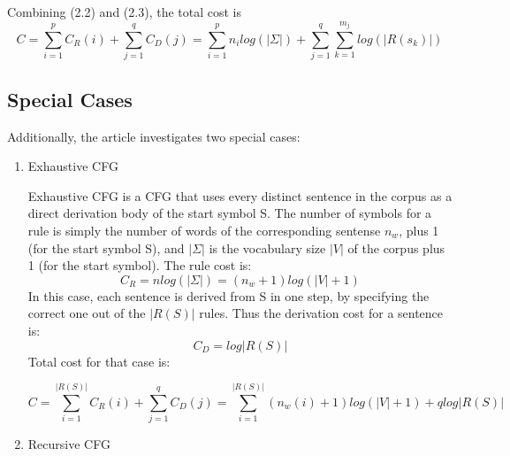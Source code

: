 \documentclass[paper=a4, fontsize=11pt]{scrartcl} %
\numberwithin{equation}{section} %
\numberwithin{figure}{section} %
\numberwithin{table}{section} %
\begin{document}
Combining (2.2) and (2.3), the total cost is
\begin{equation}\label{first}
C = \sum \limits_{i=1}^p C_R(i) + \sum\limits_{j=1}^q C_D(j) = \sum \limits_{i=1}^p n_i log(\lvert \Sigma \rvert) + \sum\limits_{j=1}^q \sum\limits_{k=1}^{m_j} log(\lvert R(s_k) \rvert)
\end{equation}

\subsection{Special Cases}
Additionally, the article investigates two special cases:
\begin{enumerate}[1.]
\item Exhaustive CFG

Exhaustive CFG is a CFG that uses every distinct sentence in the corpus as a direct derivation body of the start symbol S. The number of symbols for a rule is simply the number of words of the corresponding sentense \begin{math} n_w \end{math}, plus 1 (for the start symbol S), and \begin{math} \lvert \Sigma \rvert \end{math} is the vocabulary size \begin{math} \lvert V \rvert \end{math} of the corpus plus 1 (for the start symbol). The rule cost is:
\begin{equation}\label{first}
C_R = n log(\lvert \Sigma \rvert) = (n_w + 1)log(\lvert V \rvert + 1)
\end{equation}
In this case, each sentence is derived from S in one step, by specifying the correct one out of the \begin{math} \lvert R(S) \rvert \end{math} rules. Thus the derivation cost for a sentence is:
\begin{equation}\label{first}
C_D = log \lvert R(S) \rvert
\end{equation}
 Total cost for that case is:

\begin{equation}\label{first}
C = \sum \limits_{i=1}^{\lvert R(S) \rvert} C_R(i) + \sum \limits_{j=1}^q C_D(j) = \sum \limits_{i=1}^{\lvert R(S) \rvert} (n_w(i) + 1) log(\lvert V \rvert + 1) + q log \lvert R(S) \rvert
\end{equation}

\item Recursive CFG


\end{enumerate}
\end{document}
